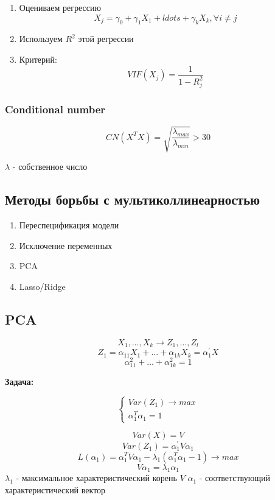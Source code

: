 \documentclass[a4paper, 12pt]{article}
\begin{document}
\begin{enumerate}
    \item Оцениваем регрессию 
    \[X_j = \gamma_0 + \gamma_1 X_1 + ldots + \gamma_k X_k,
    \forall i \neq j\]
    \item Используем $R^2$ этой регрессии
    \item Критерий:
    \[VIF(X_j) = \frac{1}{1 - R_j^2}\]
\end{enumerate}

\subsubsection{Conditional number}

\[CN(X^TX) = \sqrt{\frac{\lambda_{max}}{\lambda_{min}}} > 30\]

$\lambda$ - собственное число

\subsection{Методы борьбы с мультиколлинеарностью}

\begin{enumerate}
    \item Переспецификация модели
    \item Исключение переменных
    \item PCA
    \item Lasso/Ridge
\end{enumerate}

\subsection{PCA}

\[X_1, \ldots, X_k \rightarrow Z_1, \ldots, Z_l\]
\[Z_1 = \alpha_{11}X_1 + \ldots + \alpha_{1k}X_k = \alpha_1^{\prime}X\]
\[\alpha_{11}^2 + \ldots + \alpha_{1k}^2 = 1\]

\textbf{Задача:}

\[
\begin{cases}
    Var(Z_1) \rightarrow max \\
    \alpha_1^T \alpha_1 = 1
\end{cases}
\]

\[Var(X) = V\]
\[Var(Z_1) = \alpha^{\prime}_1V\alpha_1\]
\[L(\alpha_1) = \alpha_1^T V \alpha_1 - 
\lambda_1 (\alpha_1^T \alpha_1 - 1) 
\rightarrow max\]
\[V\alpha_1 = \lambda_1 \alpha_1\]
$\lambda_1$ - максимальное характеристический корень $V$
$\alpha_1$ - соответствующий характеристический вектор
\end{document}
